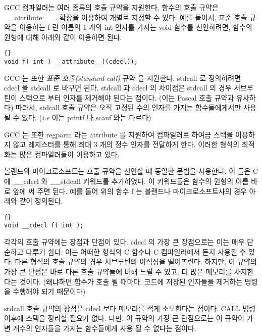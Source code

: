 GCC 컴파일러는 여러 종류의 호출 규약을 지원한다. 함수의 호출 규약은 
{\code \_\_attribute\_\_} . 확장을 이용하여 개별로 지정할 수 있다. 
예를 들어서, 표준 호출 규약을 이용하는 {\code f} 란 이름의 1 개의 {\code int} 인자를 가지는 void 함수를 선언하려면,
 함수의 원형에 대해 아래와 같이 이용하면 된다. 

\begin{lstlisting}[stepnumber=0]{}
void f( int ) __attribute__((cdecl));
\end{lstlisting}

GCC 는 또한 \emph{표준 호출(standard call)}  규약
을 지원한다. {\code stdcall} 로 정의하려면 {\code cdecl} 을 {\code stdcall} 로 바꾸면
된다. {\code stdcall} 과 {\code cdecl} 의 차이점은 {\code stdcall} 의 경우
서브루틴이 스택으로 부터 인자를 제거해야 된다는 점이다. (이는 Pascal 호출 규약과 유사하다) 
따라서, {\code stdcall} 호출 규약은 오직 고정된 수의 인자를 가지는 함수들에게서만
사용될 수 있다. (\emph{i.e} 이는 {\code printf} 나 {\code scanf} 와는 다르다) 

GCC 는 또한 {\code regparm} 라는 attribute 를 지원하여 
 컴파일러로 하여금 스택을 이용하지 않고
레지스터를 통해 최대 3 개의 정수 인자를 전달하게 한다. 이러한 형식의 최적화는
많은 컴파일러들이 이용하고 있다. 

볼랜드와 마이크로소프트는 호출 규약을 선언할 때 동일한 문법을 사용한다.
이 들은 C 에 {\code \_\_cdecl} 와
{\code \_\_stdcall} 키워드를 추가하였다. 
이 키워드들은 함수의 원형의 이름 바로 앞에 써 주면 된다. 예를 들어 위의 함수 {\code f} 는
볼랜드나 마이크로소프트사의 경우 아래와 같이 정의된다. 

\begin{lstlisting}[stepnumber=0]{}
void __cdecl f( int );
\end{lstlisting}

각각의 호출 규약에는 장점과 단점이 있다. {\code cdecl} 
 의 가장 큰 장점으로는 이는 매우 단순하고 다루기 쉽다.
이는 어떠한 형식의 C 함수나 C 컴파일러에서 든지 사용될 수 있다. 다른 형식의
호출 규약의 경우 서브루틴의 이식성을 떨어뜨린다. 하지만, 이 규약의 가장 큰
단점은 바로 다른 호출 규약들에 비해 느릴 수 있고, 더 많은 메모리를 차지한다는
것이다. (왜냐하면 함수가 호출 될 때마다, 코드에 저장된 인자들을 제거하는 명령을
수행해야 되기 때문이다) 

{\code stdcall} 호출 규약의 장점은 {\code cdecl}
보다 메모리를 적게 소모한다는 점이다. {\code CALL} 명령 이후에 스택을 정리할 필요가 없다.
다만, 이 규약의 가장 큰 단점으로는 이 규약이 가변 개수의 인자들을 가지는 
함수들에게 사용 될 수 없다는 점이다. 

